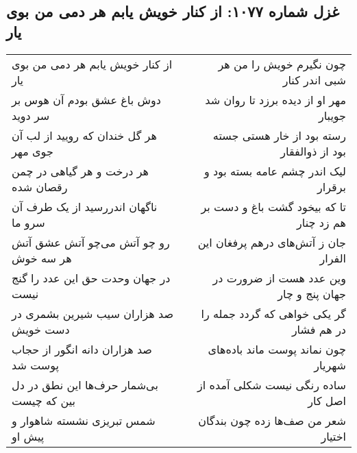 \begin{center}
\section*{غزل شماره ۱۰۷۷: از کنار خویش یابم هر دمی من بوی یار}
\label{sec:1077}
\begin{longtable}{l p{0.5cm} r}
از کنار خویش یابم هر دمی من بوی یار
&&
چون نگیرم خویش را من هر شبی اندر کنار
\\
دوش باغ عشق بودم آن هوس بر سر دوید
&&
مهر او از دیده برزد تا روان شد جویبار
\\
هر گل خندان که رویید از لب آن جوی مهر
&&
رسته بود از خار هستی جسته بود از ذوالفقار
\\
هر درخت و هر گیاهی در چمن رقصان شده
&&
لیک اندر چشم عامه بسته بود و برقرار
\\
ناگهان اندررسید از یک طرف آن سرو ما
&&
تا که بیخود گشت باغ و دست بر هم زد چنار
\\
رو چو آتش می‌چو آتش عشق آتش هر سه خوش
&&
جان ز آتش‌های درهم پرفغان این الفرار
\\
در جهان وحدت حق این عدد را گنج نیست
&&
وین عدد هست از ضرورت در جهان پنج و چار
\\
صد هزاران سیب شیرین بشمری در دست خویش
&&
گر یکی خواهی که گردد جمله را در هم فشار
\\
صد هزاران دانه انگور از حجاب پوست شد
&&
چون نماند پوست ماند باده‌های شهریار
\\
بی‌شمار حرف‌ها این نطق در دل بین که چیست
&&
ساده رنگی نیست شکلی آمده از اصل کار
\\
شمس تبریزی نشسته شاهوار و پیش او
&&
شعر من صف‌ها زده چون بندگان اختیار
\\
\end{longtable}
\end{center}
